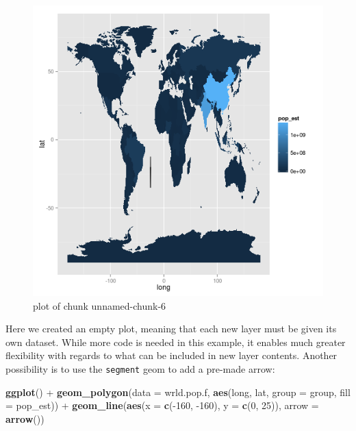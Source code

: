 \documentclass[]{article}
\makeatletter
\newenvironment{Shaded}{}{}
\newcommand{\KeywordTok}[1]{\textcolor[rgb]{0.00,0.44,0.13}{\textbf{{#1}}}}
\newcommand{\DataTypeTok}[1]{\textcolor[rgb]{0.56,0.13,0.00}{{#1}}}
\newcommand{\DecValTok}[1]{\textcolor[rgb]{0.25,0.63,0.44}{{#1}}}
\newcommand{\StringTok}[1]{\textcolor[rgb]{0.25,0.44,0.63}{{#1}}}
\newcommand{\NormalTok}[1]{{#1}}
\def\maxwidth{\ifdim\Gin@nat@width>\linewidth\linewidth
\else\Gin@nat@width\fi}
\let\Oldincludegraphics\includegraphics
\renewcommand{\includegraphics}[1]{\Oldincludegraphics[width=\maxwidth]{#1}}
\makeatother
\begin{document}
\begin{figure}[htbp]
\centering
\includegraphics{figure/unnamed-chunk-63.png}
\caption{plot of chunk unnamed-chunk-6}
\end{figure}

Here we created an empty plot, meaning that each new layer must be given
its own dataset. While more code is needed in this example, it enables
much greater flexibility with regards to what can be included in new
layer contents. Another possibility is to use the \texttt{segment} geom
to add a pre-made arrow:

\begin{Shaded}
\begin{Highlighting}[]
\KeywordTok{ggplot}\NormalTok{() +}\StringTok{ }\KeywordTok{geom_polygon}\NormalTok{(}\DataTypeTok{data =} \NormalTok{wrld.pop.f, }\KeywordTok{aes}\NormalTok{(long, lat, }\DataTypeTok{group =} \NormalTok{group, }\DataTypeTok{fill =} \NormalTok{pop_est)) +}\StringTok{ }
\StringTok{    }\KeywordTok{geom_line}\NormalTok{(}\KeywordTok{aes}\NormalTok{(}\DataTypeTok{x =} \KeywordTok{c}\NormalTok{(-}\DecValTok{160}\NormalTok{, -}\DecValTok{160}\NormalTok{), }\DataTypeTok{y =} \KeywordTok{c}\NormalTok{(}\DecValTok{0}\NormalTok{, }\DecValTok{25}\NormalTok{)), }\DataTypeTok{arrow =} \KeywordTok{arrow}\NormalTok{())}
\end{Highlighting}
\end{Shaded}
\end{document}
